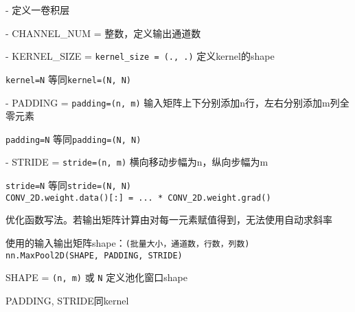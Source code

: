 \documentclass[UTF8]{ctexart}
\begin{document}
  - 定义一卷积层

  - CHANNEL\_NUM = 整数，定义输出通道数

  - KERNEL\_SIZE = \texttt{kernel\_size = (., .)} 定义kernel的shape

  \quad \texttt{kernel=N} 等同\texttt{kernel=(N, N)}
  
  - PADDING = \texttt{padding=(n, m)}  输入矩阵上下分别添加n行，左右分别添加m列全零元素

  \quad \texttt{padding=N} 等同\texttt{padding=(N, N)}
  
  - STRIDE = \texttt{stride=(n, m)} 横向移动步幅为n，纵向步幅为m
  
  \quad \texttt{stride=N} 等同\texttt{stride=(N, N)}\\
\texttt{CONV\_2D.weight.data()[:] = ... * CONV\_2D.weight.grad()}

  优化函数写法。若输出矩阵计算由对每一元素赋值得到，无法使用自动求斜率
  
  使用的输入输出矩阵shape：\texttt{(批量大小，通道数，行数，列数)}\\
\texttt{nn.MaxPool2D(SHAPE, PADDING, STRIDE)}

  SHAPE = \texttt{(n, m)} 或 \texttt{N} 定义池化窗口shape

  PADDING, STRIDE同kernel
\end{document}
